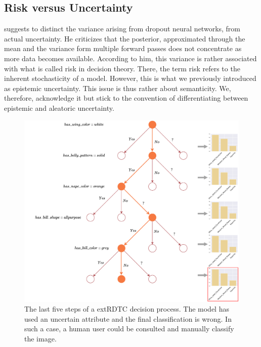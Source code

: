 \documentclass[a4paper,cleardoubleempty,BCOR1cm, 11pt]{report}
\begin{document}
\subsection{Risk versus Uncertainty}
\citet{osband2016risk} suggests to distinct the variance arising from dropout neural networks, from actual uncertainty. He  criticizes that the posterior, approximated through the mean and the variance form multiple forward passes does not concentrate as more data becomes available. According to him, this variance is rather associated with what is called risk in decision theory. There, the term risk refers to the inherent stochasticity of a model. However, this is what we previously introduced as epistemic uncertainty. This issue is thus rather about semanticity. We, therefore, acknowledge it but stick to the convention of differentiating between epistemic and aleatoric uncertainty.

\begin{figure}[t]
	\centering
	\includegraphics[width=1\textwidth]{images/example_tree.pdf}
	\caption{The last five steps of a extRDTC decision process. The model has used an uncertain attribute and the final classification is wrong. In such a case, a human user could be consulted and manually classify the image.}
	\label{fig:example_tree}
\end{figure}
\end{document}
